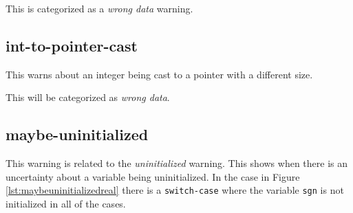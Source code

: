 \documentclass[a4paper,11pt]{report}
\newcommand{\textcode}[1]{\fboxsep=1pt\texttt{\colorbox{gray!20}{#1}}}
\begin{document}
This is categorized as a \emph{wrong data} warning.

            \fi %


            %

            \subsection*{int-to-pointer-cast}
This warns about an integer being cast to a pointer with a different size.

This will be categorized as \emph{wrong data}.


            %


            \subsection*{maybe-uninitialized}
This warning is related to the \emph{uninitialized} warning. This shows when 
there is an uncertainty about a variable being uninitialized. In the 
case in Figure \ref{lst:maybeuninitializedreal} there is a \texttt{switch-case} 
where the variable \textcode{sgn} is not initialized in all of the cases.
\end{document}
